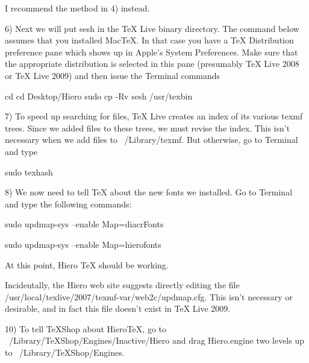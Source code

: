 I recommend the method in 4) instead.

6) Next we will put sesh in the TeX Live binary directory. The command below assumes that you installed MacTeX. In that case you have a TeX Distribution preference pane which shows up in Apple's System Preferences. Make sure that the appropriate distribution is selected in this pane (presumably TeX Live 2008 or TeX Live 2009) and then issue the Terminal commands
	
	cd 
	cd Desktop/Hiero
	sudo cp -Rv sesh /usr/texbin
	
7) To speed up searching for files, TeX Live creates an index of its various texmf trees. Since we added files to these trees, we must revise the index. This isn't necessary when we add files to ~/Library/texmf. But otherwise, go to Terminal and type

	sudo texhash
	
8) We now need to tell TeX about the new fonts we installed. Go to Terminal and type the following commands:

	sudo updmap-sys --enable Map=diacrFonts

	sudo updmap-sys --enable Map=hierofonts
	
At this point, Hiero TeX should be working.
	
Incidentally, the Hiero web site suggests directly editing the file /usr/local/texlive/2007/texmf-var/web2c/updmap.cfg. This isn't necessary or desirable, and in fact this file doesn't exist in TeX Live 2009.
	
10) To tell TeXShop about HieroTeX, go to ~/Library/TeXShop/Engines/Inactive/Hiero and drag Hiero.engine two levels up to ~/Library/TeXShop/Engines.



	
	
	